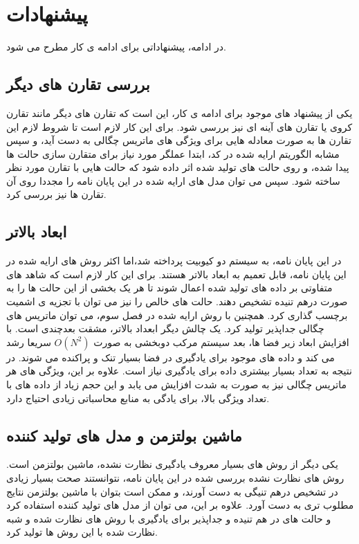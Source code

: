 \section{پیشنهادات}

در ادامه، پیشنهاداتی برای ادامه ی کار مطرح می شود.
\subsection{بررسی تقارن های دیگر}
یکی از پیشنهاد های موجود برای ادامه ی کار، این است که تقارن های دیگر مانند تقارن کروی یا تقارن های آینه ای نیز بررسی شود. برای این کار لازم است تا شروط لازم این تقارن ها به صورت معادله هایی برای ویژگی های ماتریس چگالی به دست آید، و سپس مشابه الگوریتم ارایه شده در کد، ابتدا عملگر مورد نیاز برای متقارن سازی حالت ها پیدا شده، و روی حالت های تولید شده اثر داده شود که حالت هایی با تقارن مورد نظر ساخته شود. سپس می توان مدل های ارایه شده در این پایان نامه را مجددا روی آن تقارن ها نیز بررسی کرد.
\subsection{ابعاد بالاتر}
در این پایان نامه، به سیستم دو کیوبیت پرداخته شد،‌اما اکثر روش های ارایه شده در این پایان نامه، قابل تعمیم به ابعاد بالاتر هستند. برای این کار لازم است که شاهد های متفاوتی بر داده های تولید شده اعمال شوند تا هر یک بخشی از این حالت ها را به صورت درهم تنیده تشخیص دهند. حالت های خالص را نیز می توان با تجزیه ی اشمیت برچسب گذاری کرد. همچنین با روش ارایه شده در فصل سوم، می توان ماتریس های چگالی جداپذیر تولید کرد. یک چالش دیگر ابعداد بالاتر، مشقت بعدچندی
است. با افزایش ابعاد زیر فضا ها، بعد سیستم مرکب دوبخشی به صورت
$O(N^2)$
سریعا رشد می کند و داده های موجود برای یادگیری در فضا بسیار تنک و پراکنده می شوند. در نتیجه به تعداد بسیار بیشتری داده برای یادگیری نیاز است. علاوه بر این، ویژگی های هر ماتریس چگالی نیز به صورت
به شدت افزایش می یابد و این حجم زیاد از داده های با تعداد ویژگی بالا، برای یادگی به منابع محاسباتی زیادی احتیاج دارد.
\subsection{ماشین بولتزمن و مدل های تولید کننده}
یکی دیگر از روش های بسیار معروف یادگیری نظارت نشده، ماشین بولتزمن است. روش های نظارت نشده بررسی شده در این پایان نامه، نتوانستند صحت بسیار زیادی در تشخیص درهم تنیگی به دست آورند، و ممکن است بتوان با ماشین بولتزمن نتایج مطلوب تری به دست آورد. علاوه بر این، می توان از مدل های تولید کننده
استفاده کرد و حالت های در هم تنیده و جداپذیر برای یادگیری با روش های نظارت شده و شبه نظارت شده با این روش ها تولید کرد.‌
